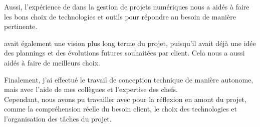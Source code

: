 Aussi, l'expérience de \damien dans la gestion de projets numériques nous a aidés à faire les bons choix de technologies et outils pour répondre au besoin de manière pertinente.

\damien avait également une vision plus long terme du projet, puisqu'il avait déjà une idée des plannings et des évolutions futures souhaitées par client. Cela nous a aussi aidés à faire de meilleurs choix.

Finalement, j'ai effectué le travail de conception technique de manière autonome, mais avec l'aide de mes collègues et l'expertise des chefs.\\
Cependant, nous avons pu travailler avec \damien pour la réflexion en amont du projet, comme la compréhension réelle du besoin client, le choix des technologies et l'organisation des tâches du projet.